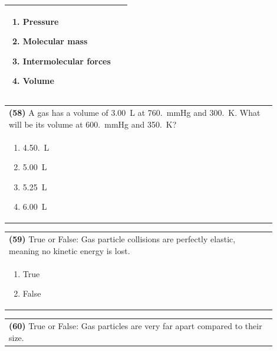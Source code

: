 \documentclass{article}
\begin{document}
{{\begin{tabular}{|p{0.9\linewidth}|}
\begin{minipage}[t]{0.85\linewidth}
\begin{enumerate}[label=\alph*.]
\item Pressure
\item Molecular mass
\item Intermolecular forces
\item Volume
\end{enumerate}
\end{minipage}\\[0.2cm]
\hline
\end{tabular}

\vspace{0.2cm}
\noindent\begin{tabular}{|p{0.9\linewidth}|}
\hline
\textbf{(58)} A gas has a volume of 3.00~L at 760.~mmHg and 300.~K. What will be its volume at 600.~mmHg and 350.~K? \\[0.2cm]

\begin{minipage}[t]{0.85\linewidth}
\begin{enumerate}[label=\alph*.]
\item 4.50.~L
\item 5.00~L
\item 5.25~L
\item 6.00~L
\end{enumerate}
\end{minipage}\\[0.2cm]
\hline
\end{tabular}

\vspace{0.2cm}
\noindent\begin{tabular}{|p{0.9\linewidth}|}
\hline
\textbf{(59)} True or False: Gas particle collisions are perfectly elastic, meaning no kinetic energy is lost.\\[0.2cm]

\begin{minipage}[t]{0.85\linewidth}
\begin{enumerate}[label=\alph*.]
\item True
\item False
\end{enumerate}
\end{minipage}\\[0.2cm]
\hline
\end{tabular}

\vspace{0.2cm}
\noindent\begin{tabular}{|p{0.9\linewidth}|}
\hline
\textbf{(60)} True or False: Gas particles are very far apart compared to their size.\\[0.2cm]


\end{tabular}}}
\end{document}
